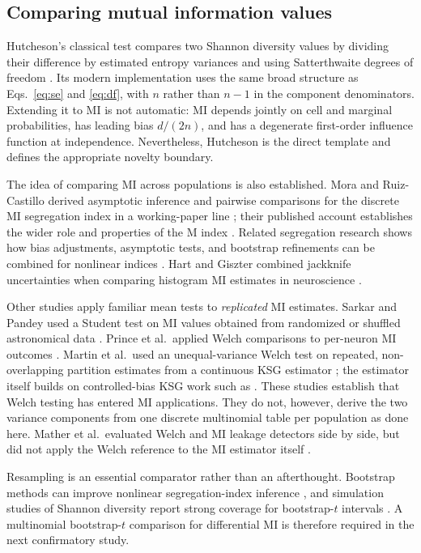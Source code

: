 \documentclass[10pt,twocolumn]{article}
\begin{document}
\subsection{Comparing mutual information values}

Hutcheson's classical test compares two Shannon diversity values by dividing
their difference by estimated entropy variances and using Satterthwaite
degrees of freedom \citep{hutcheson1970}. Its modern implementation uses the
same broad structure as Eqs.~\eqref{eq:se} and \eqref{eq:df}, with \(n\)
rather than \(n-1\) in the component denominators. Extending it to MI is not
automatic: MI depends jointly on cell and marginal probabilities, has leading
bias \(d/(2n)\), and has a degenerate first-order influence function at
independence. Nevertheless, Hutcheson is the direct template and defines the
appropriate novelty boundary.

The idea of comparing MI across populations is also established. Mora and
Ruiz-Castillo derived asymptotic inference and pairwise comparisons for the
discrete MI segregation index in a working-paper line \citep{mora2009}; their
published account establishes the wider role and properties of the M index
\citep{mora2011}. Related segregation research shows how bias adjustments,
asymptotic tests, and bootstrap refinements can be combined for nonlinear
indices \citep{allen2015}. Hart and Giszter combined jackknife uncertainties
when comparing histogram MI estimates in neuroscience \citep{hart2010}.

Other studies apply familiar mean tests to \emph{replicated} MI estimates.
Sarkar and Pandey used a Student test on MI values obtained from randomized or
shuffled astronomical data \citep{sarkar2020}. Prince et al.\ applied Welch
comparisons to per-neuron MI outcomes \citep{prince2021}. Martin et al.\ used
an unequal-variance Welch test on repeated, non-overlapping partition
estimates from a continuous KSG estimator \citep{martin2026}; the estimator
itself builds on controlled-bias KSG work such as \citet{holmes2019}.
These studies establish that Welch testing has entered MI applications. They
do not, however, derive the two variance components from one discrete
multinomial table per population as done here. Mather et al.\ evaluated
Welch and MI leakage detectors side by side, but did not apply the Welch
reference to the MI estimator itself \citep{mather2013}.

Resampling is an essential comparator rather than an afterthought. Bootstrap
methods can improve nonlinear segregation-index inference
\citep{allen2015}, and simulation studies of Shannon diversity report strong
coverage for bootstrap-\(t\) intervals \citep{palma2022}. A multinomial
bootstrap-\(t\) comparison for differential MI is therefore required in the
next confirmatory study.
\end{document}

